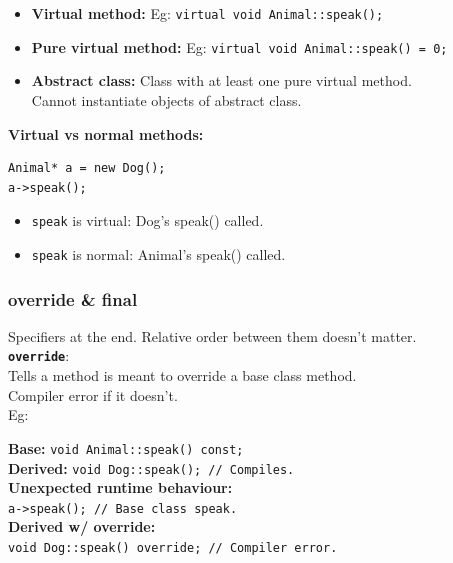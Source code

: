 \begin{itemize}
\item \textbf{Virtual method: } Eg: \texttt{virtual void Animal::speak();}
\item \textbf{Pure virtual method: } Eg: \texttt{virtual void Animal::speak() = 0;}
\item \textbf{Abstract class:} Class with at least one pure virtual method.\\
                               Cannot instantiate objects of abstract class.
\end{itemize}

\begin{mdframed}[nobreak=true,backgroundcolor=magenta!10,linecolor=magenta]
\textbf{Virtual vs normal methods:}\\
\begin{verbatim}
Animal* a = new Dog();
a->speak();
\end{verbatim}
\begin{itemize}
\item \texttt{speak} is virtual: Dog's speak() called.
\item \texttt{speak} is normal: Animal's speak() called.
\end{itemize}
\end{mdframed}


\subsubsection{override \& final}

Specifiers at the end. Relative order between them doesn't matter.\\

\textbf{\texttt{override}}:\\
Tells a method is meant to override a base class method. \\
Compiler error if it doesn't.\\
Eg:
\begin{mdframed}[nobreak=true,backgroundcolor=gray!10,linecolor=Firebrick4]
\textbf{Base:} \texttt{void Animal::speak() const;}\\
\textbf{Derived:} \texttt{void Dog::speak(); // Compiles.}\\
\textbf{Unexpected runtime behaviour:} \\
\texttt{a->speak(); // Base class speak.}\\
\textbf{Derived w/ override:} \\
\texttt{void Dog::speak() override; // Compiler error.}\\
\end{mdframed}

